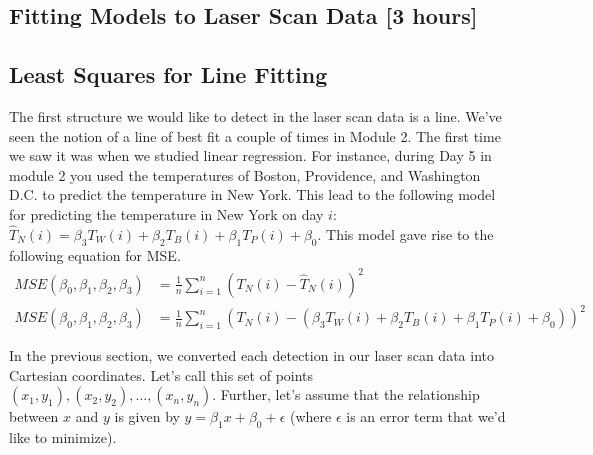 \documentclass[M3_Night5_Solutions]{subfiles}
\begin{document}
\begin{enumerate}[resume=exercises, label=\textbf{Exercise} (\arabic*)]
\ee
\ee

\section{Fitting Models to Laser Scan Data [3 hours]}


\subsection{Least Squares for Line Fitting}
The first structure we would like to detect in the laser scan data is a line.  We've seen the notion of a line of best fit a couple of times in Module 2.  The first time we saw it was when we studied linear regression.
For instance, during Day 5 in module 2 you used the temperatures of Boston, Providence, and Washington D.C. to predict the temperature in New York.  This lead to the following model for predicting the temperature in New York on day $i$: $\hat{T}_N(i) = \beta_3 T_W(i) + \beta_2 T_B(i) + \beta_1 T_P(i) + \beta_0$.  This model gave rise to the following equation for MSE.
\begin{align}
MSE(\beta_0, \beta_1, \beta_2, \beta_3) &= \frac{1}{n}\sum_{i=1}^n \left ( T_N(i) - \hat{T}_N(i) \right)^2  \nonumber \\
MSE(\beta_0, \beta_1, \beta_2, \beta_3) &= \frac{1}{n}\sum_{i=1}^n \left ( T_N(i)  - ( \beta_3 T_W(i) + \beta_2 T_B(i) + \beta_1 T_P(i) + \beta_0) \right)^2 \label{eq:MSEtemperature}
\end{align}

In the previous section, we converted each detection in our laser scan data into Cartesian coordinates.  Let's call this set of points $(x_1, y_1), (x_2, y_2), \ldots, (x_n, y_n)$.  Further, let's assume that the relationship between $x$ and $y$ is given by $y = \beta_1 x + \beta_0 + \epsilon$ (where $\epsilon$ is an error term that we'd like to minimize).





\end{enumerate}
\end{document}

